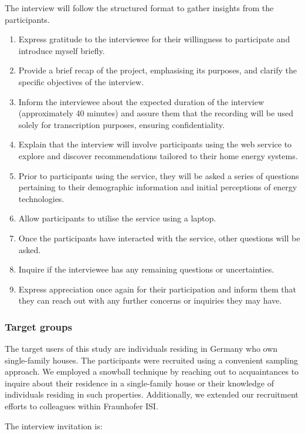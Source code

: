 The interview will follow the structured format to gather insights from the participants. 
\begin{enumerate}
  \item Express gratitude to the interviewee for their willingness to participate and introduce myself briefly.
  \item Provide a brief recap of the project, emphasising its purposes, and clarify the specific objectives of the interview.
  \item Inform the interviewee about the expected duration of the interview (approximately 40 minutes) and assure them that the recording will be used solely for transcription purposes, ensuring confidentiality.
  \item Explain that the interview will involve participants using the web service to explore and discover recommendations tailored to their home energy systems.
  \item Prior to participants using the service, they will be asked a series of questions pertaining to their demographic information and initial perceptions of energy technologies.
  \item Allow participants to utilise the service using a laptop.
  \item Once the participants have interacted with the service, other questions will be asked.
  \item Inquire if the interviewee has any remaining questions or uncertainties.
  \item Express appreciation once again for their participation and inform them that they can reach out with any further concerns or inquiries they may have.
\end{enumerate}


\subsubsection{Target groups}

The target users of this study are individuals residing in Germany who own single-family houses.
The participants were recruited using a convenient sampling approach. 
We employed a snowball technique by reaching out to acquaintances to inquire about their residence in a single-family house or their knowledge of individuals residing in such properties. 
Additionally, we extended our recruitment efforts to colleagues within Fraunhofer ISI.

The interview invitation is:

